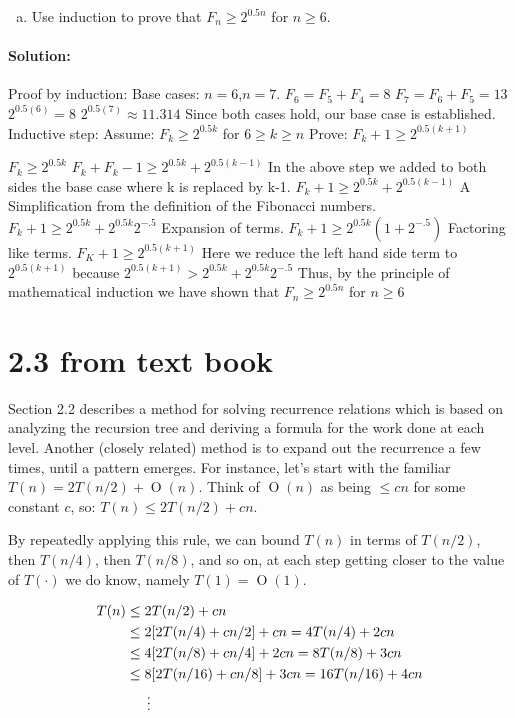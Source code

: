 \documentclass[12pt]{article}
\newcommand{\BigO}[1]{\ensuremath{\operatorname{O}\left(#1\right)}}
\begin{document}
\begin{enumerate}[(a)]
\item Use induction to prove that $F_n \geq 2^{0.5n}$ for $n \geq 6$.
\end{enumerate}

\paragraph{Solution:}
Proof by induction:
	Base cases: $n=6$,$n=7$.
	$F_6 = F_5 + F_4 = 8$
	$F_7 = F_6 + F_5 = 13$
	$2^{0.5(6)} = 8$
	$2^{0.5(7)} \approx 11.314$
	Since both cases hold, our base case is established.
Inductive step:
	Assume: $F_k \geq 2^{0.5k}$ for $6 \geq k \geq n$
	Prove: $F_k+1 \geq 2^{0.5(k+1)}$

	$F_k \geq 2^{0.5k}$
	$F_k + F_k-1 \geq 2^{0.5k} + 2^{0.5(k-1)}$
		In the above step we added to both sides the base case where k is replaced by k-1.
	$F_k+1 \geq 2^{0.5k} + 2^{0.5(k-1)}$
		A Simplification from the definition of the Fibonacci numbers.
	$F_k+1 \geq 2^{0.5k} + 2^{0.5k}2^{-.5}$
		Expansion of terms.
	$F_k+1 \geq 2^{0.5k}(1 + 2^{-.5})$
		Factoring like terms.
	$F_K+1 \geq 2^{0.5(k+1)}$
		Here we reduce the left hand side term to $2^{0.5(k+1)}$ because $2^{0.5(k+1)} > 2^{0.5k}+2^{0.5k}2^{-.5}$ 
	Thus, by the principle of mathematical induction we have shown that $F_n \geq 2^{0.5n}$ for $n \geq 6$ 
	
	
\section*{2.3 from text book}
Section 2.2 describes a method for solving recurrence relations which is
based on analyzing the recursion tree and deriving a formula for the
work done at each level.  Another (closely related) method is to expand
out the recurrence a few times, until a pattern emerges. For instance,
let’s start with the familiar $T(n) = 2T(n/2) + \BigO{n}$. Think of
$\BigO{n}$ as being $\leq cn$ for some constant $c$,
so: $T(n) \leq 2T(n/2) + cn$. 

By repeatedly applying this rule, we can bound $T(n)$ in terms of $T(n/2)$,
then $T(n/4)$, then $T(n/8)$, and so on, at each step getting closer to
the value of $T(\cdot)$ we do know,
namely $T(1) = \BigO{1}$.

\begin{align*}
T (n) &\leq 2T (n/2) + cn \\
&\leq 2[2T(n/4) + cn/2] + cn = 4T(n/4) + 2cn \\
&\leq 4[2T(n/8) + cn/4] + 2cn = 8T(n/8) + 3cn \\
&\leq 8[2T(n/16) + cn/8] + 3cn = 16T(n/16) + 4cn \\
&\indent \vdots
\end{align*}
\end{document}
